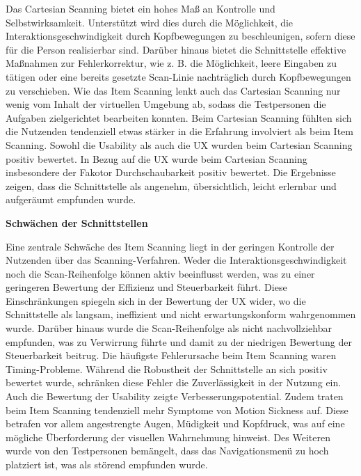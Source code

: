 Das Cartesian Scanning bietet ein hohes Maß an Kontrolle und Selbstwirksamkeit. Unterstützt wird dies durch die Möglichkeit, die Interaktionsgeschwindigkeit durch Kopfbewegungen zu beschleunigen, sofern diese für die Person realisierbar sind. Darüber hinaus bietet die Schnittstelle effektive Maßnahmen zur Fehlerkorrektur, wie z. B.  die Möglichkeit, leere Eingaben zu tätigen oder eine bereits gesetzte Scan-Linie nachträglich durch Kopfbewegungen zu verschieben.
Wie das Item Scanning lenkt auch das Cartesian Scanning nur wenig vom Inhalt der virtuellen Umgebung ab, sodass die Testpersonen die Aufgaben zielgerichtet bearbeiten konnten. Beim Cartesian Scanning fühlten sich die Nutzenden tendenziell etwas stärker in die Erfahrung involviert als beim Item Scanning.
Sowohl die Usability als auch die UX wurden beim Cartesian Scanning positiv bewertet. In Bezug auf die UX wurde beim Cartesian Scanning insbesondere der Fakotor Durchschaubarkeit positiv bewertet. Die Ergebnisse zeigen, dass die Schnittstelle als angenehm, übersichtlich, leicht erlernbar und aufgeräumt empfunden wurde.

\textbf{Schwächen der Schnittstellen}

Eine zentrale Schwäche des Item Scanning liegt in der geringen Kontrolle der Nutzenden über das Scanning-Verfahren. Weder die Interaktionsgeschwindigkeit noch die Scan-Reihenfolge können aktiv beeinflusst werden, was zu einer geringeren Bewertung der Effizienz und Steuerbarkeit führt. Diese Einschränkungen spiegeln sich in der Bewertung der UX wider, wo die Schnittstelle als langsam, ineffizient und nicht erwartungskonform wahrgenommen wurde. Darüber hinaus wurde die Scan-Reihenfolge als nicht nachvollziehbar empfunden, was zu Verwirrung führte und damit zu der niedrigen Bewertung der Steuerbarkeit beitrug.
Die häufigste Fehlerursache beim Item Scanning waren Timing-Probleme. Während die Robustheit der Schnittstelle an sich positiv bewertet wurde, schränken diese Fehler die Zuverlässigkeit in der Nutzung ein. Auch die Bewertung der Usability zeigte Verbesserungspotential.
Zudem traten beim Item Scanning tendenziell mehr Symptome von Motion Sickness auf. Diese betrafen vor allem angestrengte Augen, Müdigkeit und Kopfdruck, was auf eine mögliche Überforderung der visuellen Wahrnehmung hinweist. Des Weiteren wurde von den Testpersonen bemängelt, dass das Navigationsmenü zu hoch platziert ist, was als störend empfunden wurde. 

